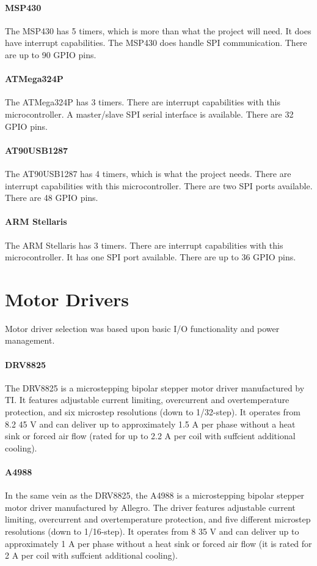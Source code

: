 \paragraph{MSP430} The MSP430 has 5 timers, which is more than what the project will need.
It does have interrupt capabilities.
The MSP430 does handle SPI communication. 
There are up to 90 GPIO pins.

\paragraph{ATMega324P} The ATMega324P has 3 timers.
There are interrupt capabilities with this microcontroller.
A master/slave SPI serial interface is available.
There are 32 GPIO pins.   

\paragraph{AT90USB1287} The AT90USB1287 has 4 timers, which is what the project needs.
There are interrupt capabilities with this microcontroller.
There are two SPI ports available. 
There are 48 GPIO pins.

\paragraph{ARM Stellaris} The ARM Stellaris has 3 timers.
There are interrupt capabilities with this microcontroller.
It has one SPI port available.
There are up to 36 GPIO pins.

\section{Motor Drivers}
Motor driver selection was based upon basic I/O functionality and power management.

\paragraph{DRV8825}
The DRV8825 is a microstepping bipolar stepper motor driver manufactured by TI.
It features adjustable current limiting, overcurrent and overtemperature protection, and six microstep resolutions (down to 1/32-step).
It operates from 8.2 45 V and can deliver up to approximately 1.5 A per phase without a heat sink or forced air ﬂow (rated for up to 2.2 A per coil with suffcient additional cooling).

\paragraph{A4988}
In the same vein as the DRV8825, the A4988 is a microstepping bipolar stepper motor driver manufactured by Allegro.
The driver features adjustable current limiting, overcurrent and overtemperature protection, and ﬁve different microstep resolutions (down to 1/16-step).
It operates from 8 35 V and can deliver up to approximately 1 A per phase without a heat sink or forced air ﬂow (it is rated for 2 A per coil with suffcient additional cooling).


